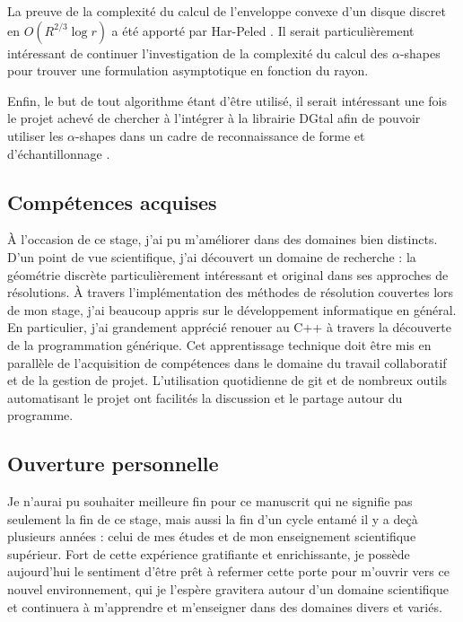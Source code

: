 La preuve de la complexité du calcul de l'enveloppe convexe d'un disque discret en $O(R^{2/3} \log r)$ a été apporté par Har-Peled  \cite{HarPeled98}. Il serait particulièrement intéressant de continuer l'investigation de la complexité du calcul des $\alpha$-shapes pour trouver une formulation asymptotique en fonction du rayon.

Enfin, le but de tout algorithme étant d'être utilisé, il serait intéressant une fois le projet achevé de chercher à l'intégrer à la librairie DGtal afin de pouvoir utiliser les $\alpha$-shapes dans un cadre de reconnaissance de forme et d’échantillonnage \cite{BernardiniB97}.


\subsection{Compétences acquises}

À l'occasion de ce stage, j'ai pu m'améliorer dans des domaines bien distincts. D'un point de vue scientifique, j'ai découvert un domaine de recherche : la géométrie discrète particulièrement intéressant et original dans ses approches de résolutions. À travers l'implémentation des méthodes de résolution couvertes lors de mon stage, j'ai beaucoup appris sur le développement informatique en général. En particulier, j'ai grandement apprécié renouer au C++ à travers la découverte de la programmation générique. Cet apprentissage technique doit être mis en parallèle de l’acquisition de compétences dans le domaine du travail collaboratif et de la gestion de projet. L'utilisation quotidienne de git et de nombreux outils automatisant le projet ont facilités la discussion et le partage autour du programme.

\subsection{Ouverture personnelle}

Je n'aurai pu souhaiter meilleure fin pour ce manuscrit qui ne signifie pas seulement la fin de ce stage, mais aussi la fin d'un cycle entamé il y a deçà plusieurs années : celui de mes études et de mon enseignement scientifique supérieur. Fort de cette expérience gratifiante et enrichissante, je possède aujourd'hui le sentiment d'être prêt à refermer cette porte pour m'ouvrir vers ce nouvel environnement, qui je l'espère gravitera autour d'un domaine scientifique et continuera à m'apprendre et m'enseigner dans des domaines divers et variés.

